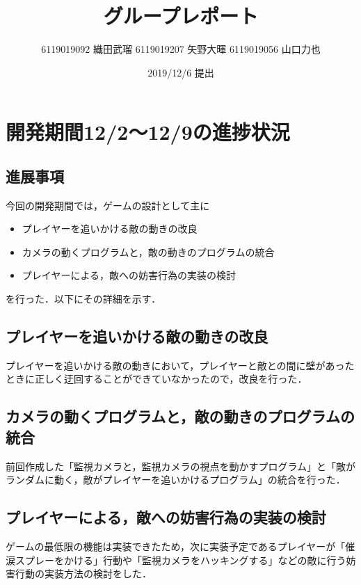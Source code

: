 \documentclass{jarticle}
\title{グループレポート}
\author{6119019092 織田武瑠 6119019207 矢野大暉 6119019056 山口力也}
\date{2019/12/6 提出}
\newcommand{\xa}{プレイヤーを追いかける敵の動きの改良}
\newcommand{\xb}{カメラの動くプログラムと，敵の動きのプログラムの統合}
\newcommand{\xc}{プレイヤーによる，敵への妨害行為の実装の検討}
\newcommand{\pitem}[3]{
\item #1
\item #2
\item #3
}
\begin{document}
\maketitle

\section{開発期間12/2～12/9の進捗状況} 

\subsection{進展事項}
今回の開発期間では，ゲームの設計として主に
\begin{itemize}
\pitem{\xa}{\xb}{\xc}
\end{itemize}
を行った．以下にその詳細を示す．

\subsection{\xa}
プレイヤーを追いかける敵の動きにおいて，プレイヤーと敵との間に壁があったときに正しく迂回することができていなかったので，改良を行った．

\subsection{\xb}
前回作成した「監視カメラと，監視カメラの視点を動かすプログラム」と「敵がランダムに動く，敵がプレイヤーを追いかけるプログラム」の統合を行った．

\subsection{\xc}
ゲームの最低限の機能は実装できたため，次に実装予定であるプレイヤーが「催涙スプレーをかける」行動や「監視カメラをハッキングする」などの敵に行う妨害行動の実装方法の検討をした．
\end{document}
